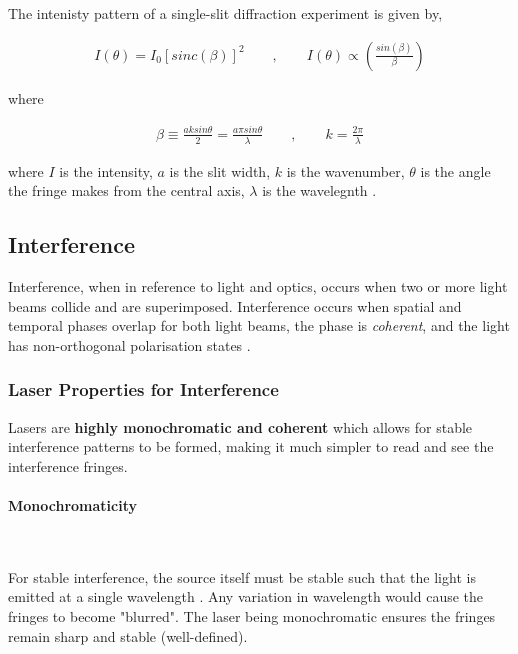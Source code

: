 \documentclass[12pt]{article}
\begin{document}
The intenisty pattern of a single-slit diffraction experiment is given by,

\vspace{-2ex}
\begin{gather*}
    I(\theta) = I_0 [sinc(\beta)]^2 \qquad , \qquad I(\theta) \propto \left( \frac{sin(\beta)}{\beta} \right)
\end{gather*}

where

\vspace{-2ex}
\begin{gather*}
    \beta \equiv \frac{ak sin \theta}{2} = \frac{a \pi sin \theta}{\lambda} \qquad , \qquad k = \frac{2 \pi}{\lambda}
\end{gather*}

where $I$ is the intensity, $a$ is the slit width, $k$ is the wavenumber, $\theta$ is the angle the fringe makes from the central axis, $\lambda$ is the wavelegnth \cite{fraunhofer}.

\subsection{Interference} \label{sec:1.3}

Interference, when in reference to light and optics, occurs when two or more light beams collide and are superimposed. Interference occurs when spatial and temporal phases overlap for both light beams,
the phase is \textit{coherent}, and the light has non-orthogonal polarisation states \cite{Paschotta_2005_interference}.

\subsubsection{Laser Properties for Interference}

Lasers are \textbf{highly monochromatic and coherent} which allows for stable interference patterns to be formed, making it much simpler to read and see the interference fringes.

\paragraph{Monochromaticity} \label{sec:1.3.1} \leavevmode\\
\vspace{-3ex}

For stable interference, the source itself must be stable such that the light is emitted at a single wavelength \cite{princelaser}.
Any variation in wavelength would cause the fringes to become "blurred". The laser being monochromatic ensures the fringes remain sharp and stable (well-defined).
\end{document}
